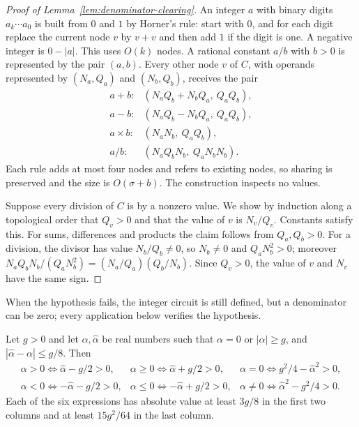 \begin{proof}[Proof of Lemma~\ref{lem:denominator-clearing}]
An integer $a$ with binary digits $a_k\cdots a_0$ is built from $0$ and $1$ by
Horner's rule: start with $0$, and for each digit replace the current node
$v$ by $v+v$ and then add $1$ if the digit is one. A negative integer is
$0-|a|$. This uses $O(k)$ nodes. A rational constant $a/b$ with $b>0$ is
represented by the pair $(a,b)$. Every other node $v$ of $C$, with operands
represented by $(N_a,Q_a)$ and $(N_b,Q_b)$, receives the pair
\[
 \begin{array}{ll}
 a+b: & (N_aQ_b+N_bQ_a,\ Q_aQ_b),\\
 a-b: & (N_aQ_b-N_bQ_a,\ Q_aQ_b),\\
 a\times b: & (N_aN_b,\ Q_aQ_b),\\
 a/b: & (N_aQ_bN_b,\ Q_aN_bN_b).
 \end{array}
\]
Each rule adds at most four nodes and refers to existing nodes, so sharing
is preserved and the size is $O(\sigma+b)$. The construction inspects no
values.

Suppose every division of $C$ is by a nonzero value. We show by induction
along a topological order that $Q_v>0$ and that the value of $v$ is
$N_v/Q_v$. Constants satisfy this. For sums, differences and products the
claim follows from $Q_a,Q_b>0$. For a division, the divisor has value
$N_b/Q_b\ne0$, so $N_b\ne0$ and $Q_aN_b^2>0$; moreover
$N_aQ_bN_b/(Q_aN_b^2)=(N_a/Q_a)(Q_b/N_b)$. Since $Q_v>0$, the value of $v$
and $N_v$ have the same sign.
\end{proof}

When the hypothesis fails, the integer circuit is still defined, but a
denominator can be zero; every application below verifies the hypothesis.

\begin{lemma}
\label{lem:upper-shifted}
Let $g>0$ and let $\alpha,\hat\alpha$ be real numbers such that $\alpha=0$ or
$|\alpha|\ge g$, and $|\hat\alpha-\alpha|\le g/8$. Then
\[
\begin{array}{lll}
 \alpha>0\iff\hat\alpha-g/2>0, &
 \alpha\ge0\iff\hat\alpha+g/2>0, &
 \alpha=0\iff g^2/4-\hat\alpha^2>0,\\[2pt]
 \alpha<0\iff-\hat\alpha-g/2>0, &
 \alpha\le0\iff-\hat\alpha+g/2>0, &
 \alpha\ne0\iff\hat\alpha^2-g^2/4>0.
\end{array}
\]
Each of the six expressions has absolute value at least $3g/8$ in the first
two columns and at least $15g^2/64$ in the last column.
\end{lemma}

